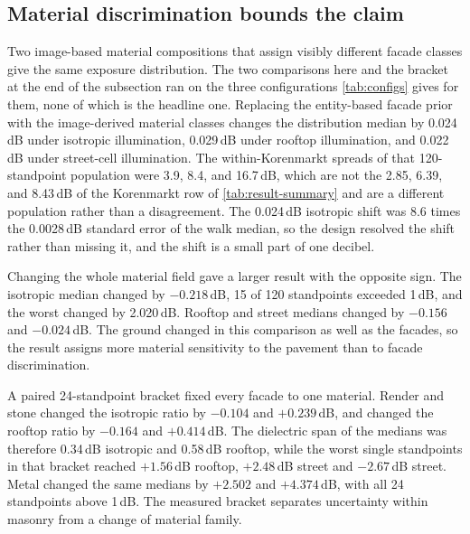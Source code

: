 \documentclass[journal]{IEEEtran}
\begin{document}
\subsection{Material discrimination bounds the claim}

Two image-based material compositions that assign visibly different facade
classes give the same exposure distribution. The two comparisons here and the
bracket at the end of the subsection ran on the three configurations
\cref{tab:configs} gives for them, none of which is the headline one.
Replacing the entity-based facade
prior with the image-derived material classes changes the distribution median by
0.024\,dB under isotropic illumination, 0.029\,dB under rooftop illumination,
and 0.022\,dB under street-cell illumination. The within-Korenmarkt
spreads of that 120-standpoint population were 3.9, 8.4, and 16.7\,dB, which are
not the 2.85, 6.39, and 8.43\,dB of the Korenmarkt row of
\cref{tab:result-summary} and are a different population rather than a
disagreement. The 0.024\,dB isotropic shift was 8.6 times the 0.0028\,dB
standard error of the walk median, so the design resolved the shift rather than
missing it, and the shift is a small part of one decibel.

Changing the whole material field gave a larger result with the opposite sign.
The isotropic median changed by $-0.218$\,dB, 15 of 120 standpoints exceeded
1\,dB, and the worst changed by 2.020\,dB. Rooftop and street medians changed by
$-0.156$ and $-0.024$\,dB. The ground changed in this comparison as well as the
facades, so the result assigns more material sensitivity to the pavement than to
facade discrimination.

A paired 24-standpoint bracket fixed every facade to one material. Render and
stone changed the isotropic ratio by $-0.104$ and $+0.239$\,dB, and changed the
rooftop ratio by $-0.164$ and $+0.414$\,dB. The dielectric span of the medians
was therefore
0.34\,dB isotropic and 0.58\,dB rooftop, while the worst single standpoints in
that bracket reached $+1.56$\,dB rooftop, $+2.48$\,dB street and $-2.67$\,dB
street. Metal changed the same medians by
$+2.502$ and $+4.374$\,dB, with all 24 standpoints above 1\,dB. The measured
bracket separates uncertainty within masonry from a change of material family.
\end{document}
